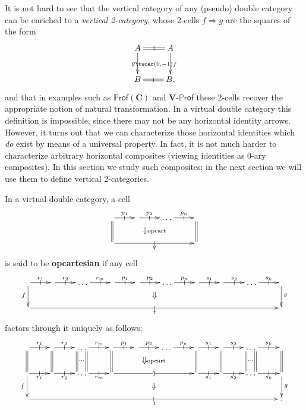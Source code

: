 \documentclass{tac}
\makeatletter
\newcommand{\mb}[1]{{\mathbf{#1}}}
\newcommand{\PROF}[1]{\mathbf{#1}\mbox{-}\mathbb{P}\mathsf{rof}}
\newcommand{\iPROF}[1]{\mathbb{P}\mathsf{rof}(\mb{#1})}
\numberwithin{equation}{section}
\def\currthmtype{}
\let\old@label\label
\def\label#1{%
    {\let\your@currentlabel\@currentlabel%
      \edef\@currentlabel{\currthmtype}%
      \old@label{label@name@#1}}%
    \old@label{#1}}
\makeatother
\begin{document}
It is not hard to see that the vertical category of any (pseudo) double
category can be enriched to a \emph{vertical 2-category}, whose
2-cells $f\Rightarrow g$ are the squares of the form
\[\vcenter{\xymatrix{A \ar@{=}[r]|-@{|}^-{} \ar[d]_g \ar@{}[dr]|{\twoar(0,-1)} & A \ar[d]^f\\
    B\ar@{=}[r]|-@{|}_-{} & B,}}
\]
and that in examples such as $\iPROF{C}$ and $\PROF{V}$ these 2-cells
recover the appropriate notion of natural transformation.  In a
virtual double category this definition is impossible, since there may
not be any horizontal identity arrows.  However, it turns out that we
can characterize those horizontal identities which \emph{do} exist by
means of a universal property.  In fact, it is not much harder to
characterize arbitrary horizontal composites (viewing identities as
0-ary composites).  In this section we study such composites; in the
next section we will use them to define vertical 2-categories.

\begin{definition}\label{defn:pfrbi-opcart}
  In a virtual double category, a cell
  \[\xymatrix{ \ar[r]|-@{|}^{p_1}\ar@{=}[d] \ar@{}[drrr]|{{\textstyle\Downarrow} \mathrm{opcart}} &
    \ar[r]|-@{|}^<>(.5){p_2} & \dots \ar[r]|-@{|}^<>(.5){p_n} &
    \ar@{=}[d]\\
    \ar[rrr]|-@{|}_q &&& }\]
  is said to be \textbf{opcartesian} if any cell
  \[\xymatrix{
    \ar[r]|-@{|}^{r_1}\ar[d]_f &
    \ar[r]|-@{|}^<>(.5){r_2} & \dots \ar[r]|-@{|}^<>(.5){r_m} &
    \ar[r]|-@{|}^{p_1}  \ar@{}[drrr]|{{\textstyle\Downarrow}} &
    \ar[r]|-@{|}^<>(.5){p_2} & \dots \ar[r]|-@{|}^<>(.5){p_n} &
    \ar[r]|-@{|}^{s_1} &
    \ar[r]|-@{|}^<>(.5){s_2} & \dots \ar[r]|-@{|}^<>(.5){s_k} &
    \ar[d]^g\\
    \ar[rrrrrrrrr]|-@{|}_t &&&&&&&&& }\]
  factors through it uniquely as follows:
  \[\xymatrix{
    \ar[r]|-@{|}^<>(.5){r_1}\ar@{=}[d] &
    \ar[r]|-@{|}^<>(.5){r_2} \ar@{=}[d] &
    \dots \ar[r]|-@{|}^<>(.5){r_m}
    \ar@{=}@<2mm>[d] \ar@{=}@<-2mm>[d] \ar@{}[d]|{\cdots} &
    \ar[r]|-@{|}^<>(.5){p_1} \ar@{=}[d]  \ar@{}[drrr]|{{\textstyle\Downarrow} \mathrm{opcart}} &
    \ar[r]|-@{|}^<>(.5){p_2} & \dots \ar[r]|-@{|}^<>(.5){p_n} &
    \ar[r]|-@{|}^<>(.5){s_1}\ar@{=}[d] &
    \ar[r]|-@{|}^<>(.5){s_2} \ar@{=}[d] &
    \dots \ar[r]|-@{|}^<>(.5){s_k}
    \ar@{=}@<2mm>[d] \ar@{=}@<-2mm>[d] \ar@{}[d]|{\cdots} &
    \ar@{=}[d]\\
    \ar[r]|-@{|}_<>(.5){r_1}\ar[d]_f &
    \ar[r]|-@{|}_<>(.5){r_2} & \dots \ar[r]|-@{|}_<>(.5){r_m} &
    \ar[rrr]|{q}  \ar@{}[drrr]|{{\textstyle\Downarrow}} &&&
    \ar[r]|-@{|}_<>(.5){s_1} &
    \ar[r]|-@{|}_<>(.5){s_2} &
    \dots \ar[r]|-@{|}_<>(.5){s_k} &
    \ar[d]^g\\
    \ar[rrrrrrrrr]|-@{|}_t &&&&&&&&& .}\]
\end{definition}
\end{document}
